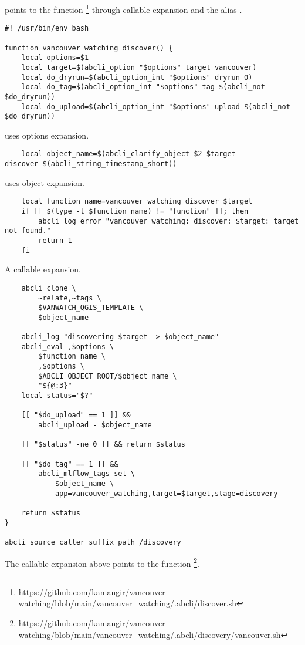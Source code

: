  points to the function \footnote{\url{https://github.com/kamangir/vancouver-watching/blob/main/vancouver_watching/.abcli/discover.sh}} through callable expansion and the alias .
%
\begin{verbatim}
#! /usr/bin/env bash

function vancouver_watching_discover() {
    local options=$1
    local target=$(abcli_option "$options" target vancouver)
    local do_dryrun=$(abcli_option_int "$options" dryrun 0)
    local do_tag=$(abcli_option_int "$options" tag $(abcli_not $do_dryrun))
    local do_upload=$(abcli_option_int "$options" upload $(abcli_not $do_dryrun))
\end{verbatim}
%
 uses options expansion.
%
\begin{verbatim}
    local object_name=$(abcli_clarify_object $2 $target-discover-$(abcli_string_timestamp_short))
\end{verbatim}
%
 uses object expansion.
%
\begin{verbatim}
    local function_name=vancouver_watching_discover_$target
    if [[ $(type -t $function_name) != "function" ]]; then
        abcli_log_error "vancouver_watching: discover: $target: target not found."
        return 1
    fi
\end{verbatim}
%
A callable expansion.
%
\begin{verbatim}
    abcli_clone \
        ~relate,~tags \
        $VANWATCH_QGIS_TEMPLATE \
        $object_name

    abcli_log "discovering $target -> $object_name"
    abcli_eval ,$options \
        $function_name \
        ,$options \
        $ABCLI_OBJECT_ROOT/$object_name \
        "${@:3}"
    local status="$?"

    [[ "$do_upload" == 1 ]] &&
        abcli_upload - $object_name

    [[ "$status" -ne 0 ]] && return $status

    [[ "$do_tag" == 1 ]] &&
        abcli_mlflow_tags set \
            $object_name \
            app=vancouver_watching,target=$target,stage=discovery

    return $status
}

abcli_source_caller_suffix_path /discovery
\end{verbatim}
%
The callable expansion above points to the function \footnote{\url{https://github.com/kamangir/vancouver-watching/blob/main/vancouver_watching/.abcli/discovery/vancouver.sh}}.
